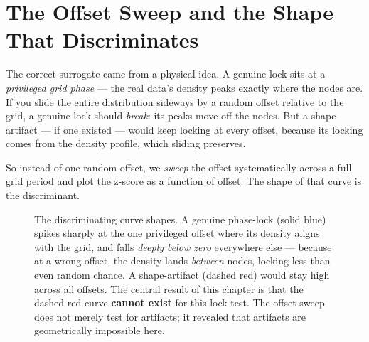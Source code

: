 \documentclass[11pt, letterpaper, openany]{book}
\begin{document}
\section{The Offset Sweep and the Shape That Discriminates}

The correct surrogate came from a physical idea. A genuine lock sits at a
\emph{privileged grid phase} --- the real data's density peaks exactly where the
nodes are. If you slide the entire distribution sideways by a random offset relative
to the grid, a genuine lock should \emph{break}: its peaks move off the nodes. But a
shape-artifact --- if one existed --- would keep locking at every offset, because its
locking comes from the density profile, which sliding preserves.

So instead of one random offset, we \emph{sweep} the offset systematically across a
full grid period and plot the z-score as a function of offset. The shape of that
curve is the discriminant.

\begin{figure}[H]
\centering
{}
\caption{The discriminating curve shapes. A genuine phase-lock (solid blue) spikes
sharply at the one privileged offset where its density aligns with the grid, and
falls \emph{deeply below zero} everywhere else --- because at a wrong offset, the
density lands \emph{between} nodes, locking less than even random chance. A
shape-artifact (dashed red) would stay high across all offsets. The central result
of this chapter is that the dashed red curve \textbf{cannot exist} for this lock
test. The offset sweep does not merely test for artifacts; it revealed that
artifacts are geometrically impossible here.}
\label{fig:sweep_curves}
\end{figure}
\end{document}
